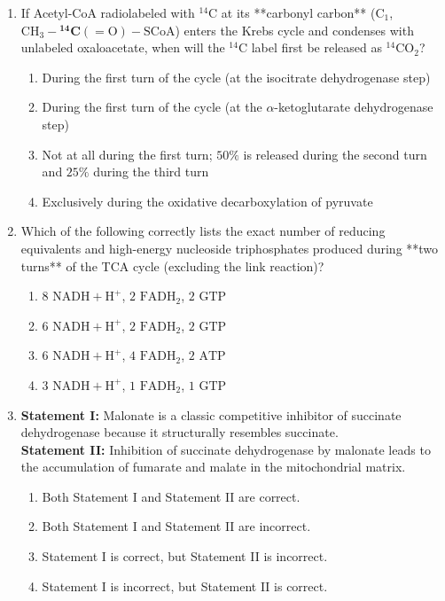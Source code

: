 \documentclass[11pt, a4paper]{article}
\begin{document}
\begin{enumerate}[label=\textbf{\arabic*.}]
\item If Acetyl-CoA radiolabeled with $^{14}\text{C}$ at its **carbonyl carbon** ($\text{C}_1$, $\text{CH}_3-\mathbf{^{14}C}(=\text{O})-\text{SCoA}$) enters the Krebs cycle and condenses with unlabeled oxaloacetate, when will the $^{14}\text{C}$ label first be released as $^{14}\text{CO}_2$?
\begin{enumerate}[label=(\Alph*)]
    \item During the first turn of the cycle (at the isocitrate dehydrogenase step)
    \item During the first turn of the cycle (at the $\alpha$-ketoglutarate dehydrogenase step)
    \item Not at all during the first turn; $50\%$ is released during the second turn and $25\%$ during the third turn
    \item Exclusively during the oxidative decarboxylation of pyruvate
\end{enumerate}

\item Which of the following correctly lists the exact number of reducing equivalents and high-energy nucleoside triphosphates produced during **two turns** of the TCA cycle (excluding the link reaction)?
\begin{enumerate}[label=(\Alph*)]
    \item $8\text{ NADH} + \text{H}^+$, $2\text{ FADH}_2$, $2\text{ GTP}$
    \item $6\text{ NADH} + \text{H}^+$, $2\text{ FADH}_2$, $2\text{ GTP}$
    \item $6\text{ NADH} + \text{H}^+$, $4\text{ FADH}_2$, $2\text{ ATP}$
    \item $3\text{ NADH} + \text{H}^+$, $1\text{ FADH}_2$, $1\text{ GTP}$
\end{enumerate}

\item \textbf{Statement I:} Malonate is a classic competitive inhibitor of succinate dehydrogenase because it structurally resembles succinate. \\
\textbf{Statement II:} Inhibition of succinate dehydrogenase by malonate leads to the accumulation of fumarate and malate in the mitochondrial matrix.
\begin{enumerate}[label=(\Alph*)]
    \item Both Statement I and Statement II are correct.
    \item Both Statement I and Statement II are incorrect.
    \item Statement I is correct, but Statement II is incorrect.
    \item Statement I is incorrect, but Statement II is correct.
\end{enumerate}


\end{enumerate}
\end{document}
